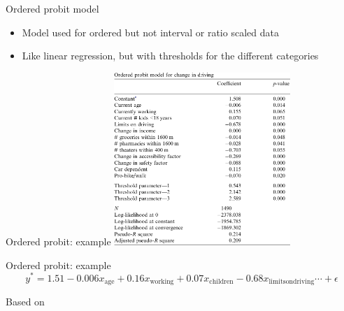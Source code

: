 

\begin{frame}{Ordered probit model}
  \begin{itemize}
    \item Model used for ordered but not interval or ratio scaled data
    \item Like linear regression, but with thresholds for the different categories
  \end{itemize}
\end{frame}

\begin{frame}{Ordered probit: example}
  \centering\includegraphics[width=0.5\textwidth]{img/handy_oprobit.png}\\
  \tiny \textcite{handy_correlation_2005}
\end{frame}

\begin{frame}{Ordered probit: example}
  \begin{equation*}
    y^* = 1.51 - 0.006 x_{\mathrm{age}} + 0.16 x_{\mathrm{working}} + 0.07 x_{\mathrm{children}} - 0.68 x_{\mathrm{limits on driving}} \cdots + \epsilon
  \end{equation*}


  {\tiny Based on \textcite{handy_correlation_2005}}
\end{frame}

